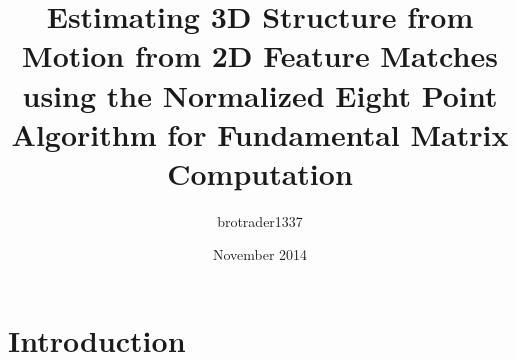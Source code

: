 \documentclass{article}
\title{Estimating 3D Structure from Motion from 2D Feature Matches using the Normalized Eight Point Algorithm for Fundamental Matrix Computation}
\author{brotrader1337 }
\date{November 2014}
\begin{document}
\maketitle

\section{Introduction}
\end{document}
